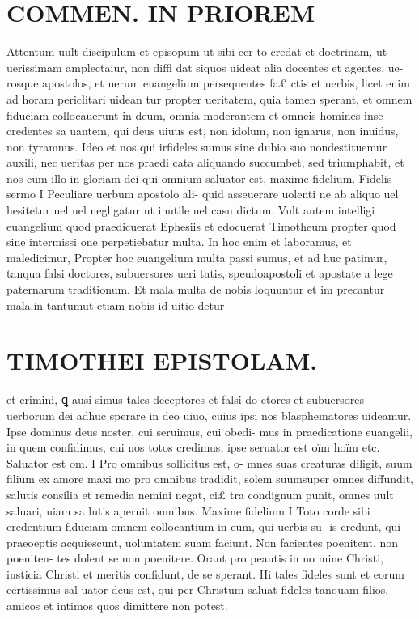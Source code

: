\documentclass{article}
\begin{document}
\begin{pages}
\section*{COMMEN. IN PRIOREM }
\marginpar{[ p.106 ]}\pstart Attentum uult discipulum et episopum ut sibi cer to credat et doctrinam, ut uerissimam amplectaiur, non diffi dat siquos uideat alia docentes et agentes, ue- rosque apostolos, et uerum euangelium persequentes fa£ ctis et uerbis, licet enim ad horam periclitari uidean tur propter ueritatem, quia tamen sperant, et omnem fiduciam collocauerunt in deum, omnia moderantem et omneis homines inse credentes sa uantem, qui deus uiuus est, non idolum, non ignarus, non inuidus, non tyramnus. Ideo et nos qui irfideles sumus sine dubio suo nondestituemur auxili, nec ueritas per nos praedi cata aliquando succumbet, sed triumphabit, et nos cum illo in gloriam dei qui omnium saluator est, maxime fidelium.  \pend\pstart Fidelis sermo I Peculiare uerbum apostolo ali- quid asseuerare uolenti ne ab aliquo uel hesitetur uel uel negligatur ut inutile uel casu dictum. Vult autem intelligi euangelium quod praedicuerat Ephesiis et edocuerat Timotheum propter quod sine intermissi one perpetiebatur multa.  \pend\pstart In hoc enim et laboramus, et maledicimur, Propter hoc euangelium multa passi sumus, et ad huc patimur, tanqua falsi doctores, subuersores ueri tatis, speudoapostoli et apostate a lege paternarum traditionum. Et mala multa de nobis loquuntur et im precantur mala.in tantumut etiam nobis id uitio detur  \pend
\section*{TIMOTHEI EPISTOLAM. }
\marginpar{[ p.107 ]}\pstart et crimini, ꝗ ausi simus tales deceptores et falsi do ctores et subuersores uerborum dei adhuc sperare in deo uiuo, cuius ipsi nos blasphematores uideamur. Ipse dominus deus noster, cui seruimus, cui obedi- mus in praedicatione euangelii, in quem confidimus, cui nos totos credimus, ipse seruator est oïm hoïm etc.  \pend\pstart Saluator est om. I Pro omnibus sollicitus est, o- mnes suas creaturas diligit, suum filium ex amore maxi mo pro omnibus tradidit, solem suumsuper omnes diffundit, salutis consilia et remedia nemini negat, ci£ tra condignum punit, omnes uult saluari, uiam sa lutis aperuit omnibus.  \pend\pstart Maxime fidelium I Toto corde sibi credentium fiduciam omnem collocantium in eum, qui uerbis su- is credunt, qui praeoeptis acquiescunt, uoluntatem suam faciunt. Non facientes poenitent, non poeniten- tes dolent se non poenitere. Orant pro peautis in no mine Christi, iusticia Christi et meritis confidunt, de se sperant. Hi tales fideles sunt et eorum certissimus sal uator deus est, qui per Christum saluat fideles tanquam filios, amicos et intimos quos dimittere non potest.  \pend
{}
{}

\end{pages}
\end{document}
